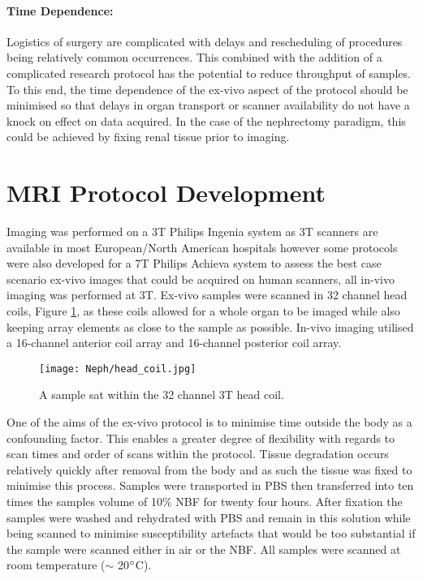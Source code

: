 \paragraph{Time Dependence:} Logistics of surgery are complicated with delays and rescheduling of procedures being relatively common occurrences. This combined with the addition of a complicated research protocol has the potential to reduce throughput of samples. To this end, the time dependence of the ex-vivo aspect of the protocol should be minimised so that delays in organ transport or scanner availability do not have a knock on effect on data acquired. In the case of the nephrectomy paradigm, this could be achieved by fixing renal tissue prior to imaging.


\section{MRI Protocol Development}

Imaging was performed on a 3T Philips Ingenia system as 3T scanners are available in most European/North American hospitals however some protocols were also developed for a 7T Philips Achieva system to assess the best case scenario ex-vivo images that could be acquired on human scanners, all in-vivo imaging was performed at 3T. Ex-vivo samples were scanned in 32 channel head coils, Figure \ref{fig:ex_head_coil}, as these coils allowed for a whole organ to be imaged while also keeping array elements as close to the sample as possible. In-vivo imaging utilised a 16-channel anterior coil array and 16-channel posterior coil array.

\begin{figure}[H]
	\centering
	\texttt{[image: Neph/head\_coil.jpg]}
	\caption{A sample sat within the 32 channel 3T head coil.}
	\label{fig:ex_head_coil}	
\end{figure}

One of the aims of the ex-vivo protocol is to minimise time outside the body as a confounding factor. This enables a greater degree of flexibility with regards to scan times and order of scans within the protocol. Tissue degradation occurs relatively quickly after removal from the body and as such the tissue was fixed to minimise this process. Samples were transported in \acf{PBS} then transferred into ten times the samples volume of 10\% \acf{NBF} for twenty four hours. After fixation the samples were washed and rehydrated with \ac{PBS} and remain in this solution while being scanned to minimise susceptibility artefacts that would be too substantial if the sample were scanned either in air or the \ac{NBF}. All samples were scanned at room temperature ($\sim$ 20$\degree$C).

